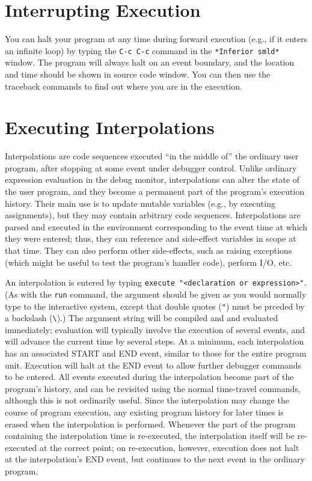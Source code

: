 \section{Interrupting Execution}
\label{sec:interrupts}
You can halt your program at any time during forward execution 
(e.g., if it enters an infinite loop)
by typing the \verb'C-c C-c' command in the \verb'*Inferior smld*' window.
The program will always halt on an event boundary, and the location and time
should be shown in source code window.  You can then use the traceback 
commands to find out where you are in the execution.

\section{Executing Interpolations}
\label{sec:interpolations}
Interpolations are code sequences executed ``in the middle of'' 
the ordinary user program, after stopping at some event under debugger
control.  Unlike ordinary expression evaluation in the
debug monitor, interpolations can alter the state of the user program,
and they become a permanent part of the program's
execution history.  Their main use is to update
mutable variables (e.g., by executing assignments), but they may contain
arbitrary code sequences.  Interpolations are parsed and executed in the
environment corresponding to the event time at which they were 
entered; thus, they can reference and side-effect
variables in scope at that time.  They can also perform other side-effects,
such as raising exceptions (which might be useful to test the program's
handler code), perform I/O, etc.

An interpolation is entered by typing 
\verb'execute "<declaration or expression>"'. (As with the \verb'run'
command, the argument should be given as you would normally type to the
interactive system, except that double quotes (\verb'"') must be
prceded by a backslash (\verb'\').) The argument string will be compiled and
and evaluated immediately; evaluation will typically involve the execution of 
several events, and will advance the current time by several steps.  At a
minimum, each interpolation has an associated START and END event, similar
to those for the entire program unit.  Execution will halt at the END event
to allow further debugger commands to be entered.  All events executed
during the interpolation become part of the program's history, and can be
revisited using the normal time-travel commands, although this is not
ordinarily useful. Since the interpolation may change the course of
program execution, any existing program history for later times is erased
when the interpolation is performed.
Whenever the part of the program containing the
interpolation time is re-executed, the interpolation itself will be 
re-executed at the correct point; on re-execution, however, execution does
not halt at the interpolation's END event, but continues to the next 
event in the ordinary program.

